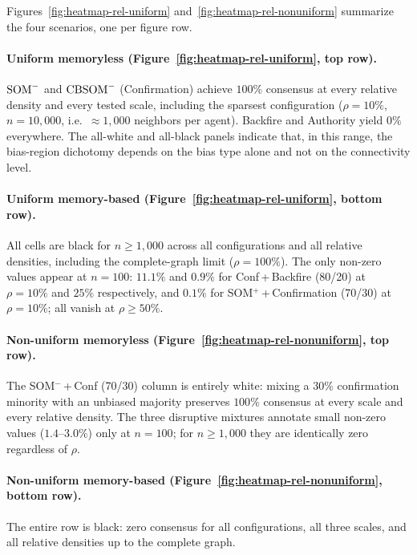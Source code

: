 Figures~\ref{fig:heatmap-rel-uniform} and~\ref{fig:heatmap-rel-nonuniform}
summarize the four scenarios, one per figure row.

\paragraph{Uniform memoryless (Figure~\ref{fig:heatmap-rel-uniform}, top row).}
$\mathrm{SOM}^{-}$ and $\mathrm{CBSOM}^{-}$ (Confirmation) achieve $100\%$ consensus
at every relative density and every tested scale, including the
sparsest configuration ($\rho=10\%$, $n=10{,}000$,
i.e.\ $\approx\!1{,}000$ neighbors per agent).
Backfire and Authority yield $0\%$ everywhere.
The all-white and all-black panels indicate that, in this range, the
bias-region dichotomy depends on the bias type alone and not on the
connectivity level.

\paragraph{Uniform memory-based (Figure~\ref{fig:heatmap-rel-uniform}, bottom row).}
All cells are black for $n\ge 1{,}000$ across all configurations and
all relative densities, including the complete-graph limit
($\rho=100\%$).
The only non-zero values appear at $n=100$: $11.1\%$ and $0.9\%$
for Conf\,+\,Backfire (80/20) at $\rho=10\%$ and $25\%$
respectively, and $0.1\%$ for SOM$^+$\,+\,Confirmation (70/30) at
$\rho=10\%$; all vanish at $\rho\ge 50\%$.

\paragraph{Non-uniform memoryless (Figure~\ref{fig:heatmap-rel-nonuniform}, top row).}
The SOM$^-$\,+\,Conf (70/30) column is entirely white: mixing a $30\%$
confirmation minority with an unbiased majority preserves $100\%$
consensus at every scale and every relative density.
The three disruptive mixtures annotate small non-zero values
($1.4$--$3.0\%$) only at $n=100$; for $n\ge 1{,}000$ they are
identically zero regardless of $\rho$.

\paragraph{Non-uniform memory-based (Figure~\ref{fig:heatmap-rel-nonuniform}, bottom row).}
The entire row is black: zero consensus for all configurations,
all three scales, and all relative densities up to the complete graph.


